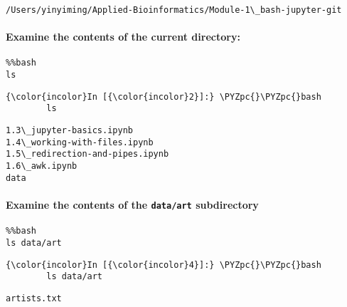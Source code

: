 \documentclass[11pt]{article}
\def\PYZpc{\char`\%}
\begin{document}
    \begin{Verbatim}[commandchars=\\\{\}]
/Users/yinyiming/Applied-Bioinformatics/Module-1\_bash-jupyter-git

    \end{Verbatim}

    \paragraph{Examine the contents of the current
directory:}\label{examine-the-contents-of-the-current-directory}

\begin{verbatim}
%%bash
ls
\end{verbatim}

    \begin{Verbatim}[commandchars=\\\{\}]
{\color{incolor}In [{\color{incolor}2}]:} \PYZpc{}\PYZpc{}bash
        ls
\end{Verbatim}


    \begin{Verbatim}[commandchars=\\\{\}]
1.3\_jupyter-basics.ipynb
1.4\_working-with-files.ipynb
1.5\_redirection-and-pipes.ipynb
1.6\_awk.ipynb
data

    \end{Verbatim}

    \paragraph{\texorpdfstring{Examine the contents of the \texttt{data/art}
subdirectory}{Examine the contents of the data/art subdirectory}}\label{examine-the-contents-of-the-dataart-subdirectory}

\begin{verbatim}
%%bash
ls data/art
\end{verbatim}

    \begin{Verbatim}[commandchars=\\\{\}]
{\color{incolor}In [{\color{incolor}4}]:} \PYZpc{}\PYZpc{}bash
        ls data/art
\end{Verbatim}


    \begin{Verbatim}[commandchars=\\\{\}]
artists.txt

    \end{Verbatim}
\end{document}
